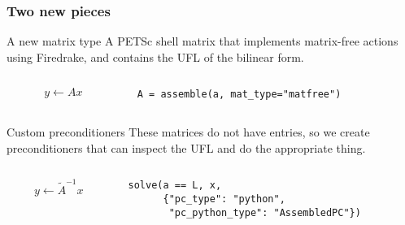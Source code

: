 \documentclass[presentation]{beamer}
\begin{document}
\begin{frame}[fragile,t]
  \frametitle{Two new pieces}
  \begin{block}{A new matrix type}
    A PETSc shell matrix that implements matrix-free actions using
    Firedrake, and contains the UFL of the bilinear form.
    \begin{columns}
      \begin{column}{0.5\textwidth}
      \begin{equation*}
        y \leftarrow A x
      \end{equation*}
    \end{column}
    \begin{column}{0.5\textwidth}
\begin{verbatim}
A = assemble(a, mat_type="matfree")
\end{verbatim}
    \end{column}
    \end{columns}
  \end{block}
  \vspace{1.5\baselineskip}
  \begin{block}{Custom preconditioners}
    These matrices do not have entries, so we create preconditioners
    that can inspect the UFL and do the appropriate thing.
    \begin{columns}
      \begin{column}{0.5\textwidth}
    \begin{equation*}
      y \leftarrow \tilde{A}^{-1} x
    \end{equation*}
  \end{column}
  \begin{column}{0.5\textwidth}
\begin{verbatim}
solve(a == L, x, 
      {"pc_type": "python",
       "pc_python_type": "AssembledPC"})
\end{verbatim}
  \end{column}
  \end{columns}
  \end{block}
\end{frame}
\end{document}

